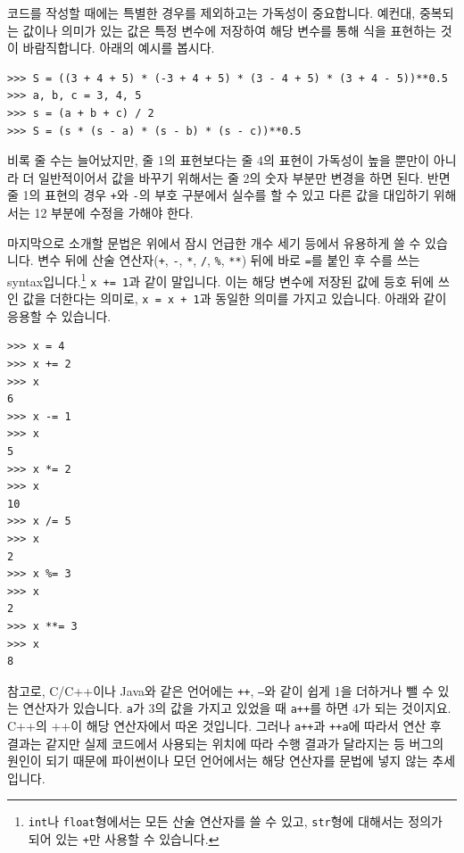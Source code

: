 \documentclass[../main.tex]{subfiles}
\begin{document}
코드를 작성할 때에는 특별한 경우를 제외하고는 가독성이 중요합니다.
예컨대, 중복되는 값이나 의미가 있는 값은 특정 변수에 저장하여 해당 변수를 통해 식을 표현하는 것이 바람직합니다.
아래의 예시를 봅시다.
\begin{verbatim}
>>> S = ((3 + 4 + 5) * (-3 + 4 + 5) * (3 - 4 + 5) * (3 + 4 - 5))**0.5
>>> a, b, c = 3, 4, 5
>>> s = (a + b + c) / 2
>>> S = (s * (s - a) * (s - b) * (s - c))**0.5
\end{verbatim}
비록 줄 수는 늘어났지만, 줄 1의 표현보다는 줄 4의 표현이 가독성이 높을 뿐만이 아니라 더 일반적이어서 값을 바꾸기 위해서는 줄 2의 숫자 부분만 변경을 하면 된다.
반면 줄 1의 표현의 경우 \texttt{+}와 \texttt{-}의 부호 구분에서 실수를 할 수 있고 다른 값을 대입하기 위해서는 12 부분에 수정을 가해야 한다.

마지막으로 소개할 문법은 위에서 잠시 언급한 개수 세기 등에서 유용하게 쓸 수 있습니다.
변수 뒤에 산술 연산자(\texttt{+}, \texttt{-}, \texttt{*}, \texttt{/}, \texttt{\%}, \texttt{**}) 뒤에 바로 \texttt{=}를 붙인 후 수를 쓰는 syntax입니다.\footnote{\texttt{int}나 \texttt{float}형에서는 모든 산술 연산자를 쓸 수 있고, \texttt{str}형에 대해서는 정의가 되어 있는 \texttt{+}만 사용할 수 있습니다.}
\texttt{x += 1}과 같이 말입니다.
이는 해당 변수에 저장된 값에 등호 뒤에 쓰인 값을 더한다는 의미로, \texttt{x = x + 1}과 동일한 의미를 가지고 있습니다.
아래와 같이 응용할 수 있습니다.
\begin{verbatim}
>>> x = 4
>>> x += 2
>>> x
6
>>> x -= 1
>>> x
5
>>> x *= 2
>>> x
10
>>> x /= 5
>>> x
2
>>> x %= 3
>>> x
2
>>> x **= 3
>>> x
8
\end{verbatim}
참고로, C/C++이나 Java와 같은 언어에는 \texttt{++}, \texttt{--}와 같이 쉽게 1을 더하거나 뺄 수 있는 연산자가 있습니다.
\texttt{a}가 3의 값을 가지고 있었을 때 \texttt{a++}를 하면 4가 되는 것이지요.
C++의 ++이 해당 연산자에서 따온 것입니다.
그러나 \texttt{a++}과 \texttt{++a}에 따라서 연산 후 결과는 같지만 실제 코드에서 사용되는 위치에 따라 수행 결과가 달라지는 등 버그의 원인이 되기 때문에 파이썬이나 모던 언어에서는 해당 연산자를 문법에 넣지 않는 추세입니다.
\end{document}
